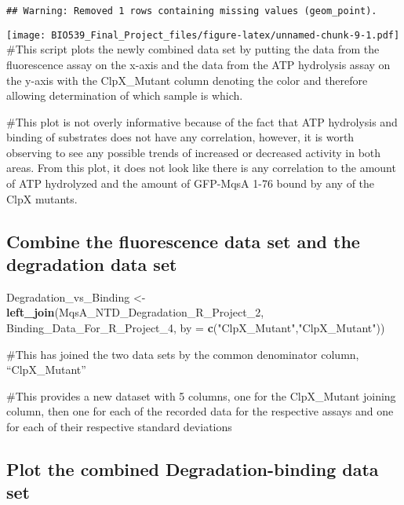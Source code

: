 \documentclass[]{article}
\newenvironment{Shaded}{\begin{snugshade}}{\end{snugshade}}
\newcommand{\DataTypeTok}[1]{\textcolor[rgb]{0.13,0.29,0.53}{#1}}
\newcommand{\DecValTok}[1]{\textcolor[rgb]{0.00,0.00,0.81}{#1}}
\newcommand{\KeywordTok}[1]{\textcolor[rgb]{0.13,0.29,0.53}{\textbf{#1}}}
\newcommand{\NormalTok}[1]{#1}
\newcommand{\StringTok}[1]{\textcolor[rgb]{0.31,0.60,0.02}{#1}}
\begin{document}
\begin{verbatim}
## Warning: Removed 1 rows containing missing values (geom_point).
\end{verbatim}

\texttt{[image: BIO539\_Final\_Project\_files/figure-latex/unnamed-chunk-9-1.pdf]}
\#This script plots the newly combined data set by putting the data from
the fluorescence assay on the x-axis and the data from the ATP
hydrolysis assay on the y-axis with the ClpX\_Mutant column denoting the
color and therefore allowing determination of which sample is which.

\#This plot is not overly informative because of the fact that ATP
hydrolysis and binding of substrates does not have any correlation,
however, it is worth observing to see any possible trends of increased
or decreased activity in both areas. From this plot, it does not look
like there is any correlation to the amount of ATP hydrolyzed and the
amount of GFP-MqsA 1-76 bound by any of the ClpX mutants.

\hypertarget{combine-the-fluorescence-data-set-and-the-degradation-data-set}{%
\subsection{Combine the fluorescence data set and the degradation data
set}\label{combine-the-fluorescence-data-set-and-the-degradation-data-set}}

\begin{Shaded}
\begin{Highlighting}[]
\NormalTok{Degradation_vs_Binding <-}\StringTok{ }\KeywordTok{left_join}\NormalTok{(MqsA_NTD_Degradation_R_Project_}\DecValTok{2}\NormalTok{, Binding_Data_For_R_Project_}\DecValTok{4}\NormalTok{,}
                            \DataTypeTok{by =} \KeywordTok{c}\NormalTok{(}\StringTok{"ClpX_Mutant"}\NormalTok{,}\StringTok{"ClpX_Mutant"}\NormalTok{))}
\end{Highlighting}
\end{Shaded}

\#This has joined the two data sets by the common denominator column,
``ClpX\_Mutant''

\#This provides a new dataset with 5 columns, one for the ClpX\_Mutant
joining column, then one for each of the recorded data for the
respective assays and one for each of their respective standard
deviations

\hypertarget{plot-the-combined-degradation-binding-data-set}{%
\subsection{Plot the combined Degradation-binding data
set}\label{plot-the-combined-degradation-binding-data-set}}
\end{document}

